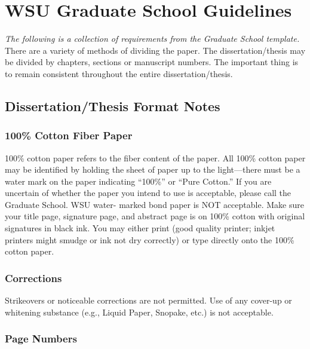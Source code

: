 \chapter{WSU Graduate School Guidelines}

\emph{The following is a collection of requirements from the Graduate School template.}
\\

There are a variety of methods of dividing the paper. The dissertation/thesis may be divided by chapters, sections or manuscript numbers. The important thing is to remain consistent throughout the entire dissertation/thesis.

\section{Dissertation/Thesis Format Notes}

\subsection{100\% Cotton Fiber Paper}

100\% cotton paper refers to the fiber content of the paper. All 100\% cotton paper may be identified by holding the sheet of paper up to the light—there must be a water mark on the paper indicating “100\%” or “Pure Cotton.” If you are uncertain of whether the paper you intend to use is acceptable, please call the Graduate School. WSU water- marked bond paper is NOT acceptable. Make sure your title page, signature page, and abstract page is on 100\% cotton with original signatures in black ink. You may either print (good quality printer; inkjet printers might smudge or ink not dry correctly) or type directly onto the 100\% cotton paper.

\subsection{Corrections}

Strikeovers or noticeable corrections are not permitted. Use of any cover-up or whitening substance (e.g., Liquid Paper, Snopake, etc.) is not acceptable.

\subsection{Page Numbers}

